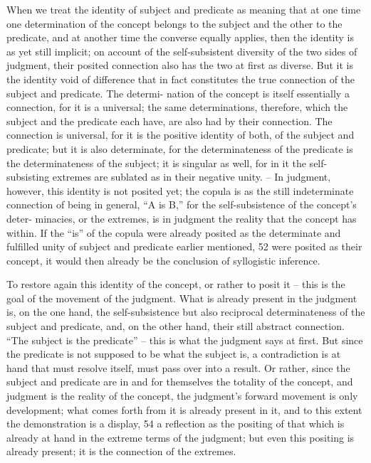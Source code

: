 When we treat the identity of subject and predicate as meaning that at
one time one determination of the concept belongs to the subject and the
other to the predicate, and at another time the converse equally applies,
then the identity is as yet still implicit; on account of the self-subsistent
diversity of the two sides of judgment, their posited connection also has
the two at first as diverse. But it is the identity void of difference that in fact
constitutes the true connection of the subject and predicate. The determi-
nation of the concept is itself essentially a connection, for it is a universal; the
same determinations, therefore, which the subject and the predicate each
have, are also had by their connection. The connection is universal, for it
is the positive identity of both, of the subject and predicate; but it is also
determinate, for the determinateness of the predicate is the determinateness
of the subject; it is singular as well, for in it the self-subsisting extremes are
sublated as in their negative unity. – In judgment, however, this identity
is not posited yet; the copula is as the still indeterminate connection of
being in general, “A is B,” for the self-subsistence of the concept's deter-
minacies, or the extremes, is in judgment the reality that the concept has
within. If the “is” of the copula were already posited as the determinate
and fulfilled unity of subject and predicate earlier mentioned, 52 were
posited as their concept, it would then already be the conclusion of syllogistic
inference.

To restore again this identity of the concept, or rather to posit it – this
is the goal of the movement of the judgment. What is already present in
the judgment is, on the one hand, the self-subsistence but also reciprocal
determinateness of the subject and predicate, and, on the other hand,
their still abstract connection. “The subject is the predicate” – this is what
the judgment says at first. But since the predicate is not supposed to be
what the subject is, a contradiction is at hand that must resolve itself, must
pass over into a result. Or rather, since the subject and predicate are in
and for themselves the totality of the concept, and judgment is the reality
of the concept, the judgment's forward movement is only development;
what comes forth from it is already present in it, and to this extent the
demonstration is a display, 54 a reflection as the positing of that which is already
at hand in the extreme terms of the judgment; but even this positing is
already present; it is the connection of the extremes.

